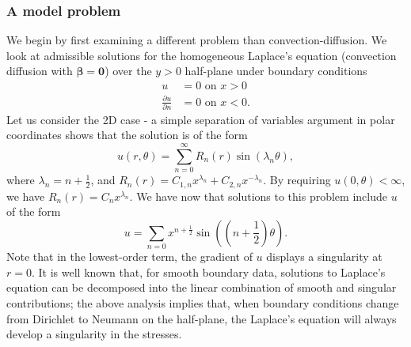 \documentclass[letterpaper]{article}
\def\bbeta{\boldsymbol\beta}
\newcommand{\bs}[1]{\boldsymbol{#1}}
\newcommand{\seclab}[1]{\label{sec:#1}}
\newcommand{\LRp}[1]{\left( #1 \right)}
\newcommand{\pd}[2]{\frac{\partial#1}{\partial#2}}
\begin{document}
\subsubsection{A model problem}
\seclab{sec:confusionPlate}
We begin by first examining a different problem than convection-diffusion.
We look at admissible solutions for the homogeneous Laplace's equation
(convection diffusion with $\bbeta=\bs 0$) over
the $y > 0$ half-plane under boundary conditions
\begin{align*}
u &= 0 \text{ on } x > 0\\
\pd{u}{n} &= 0 \text{ on } x < 0.
\end{align*}
Let us consider the 2D case - a simple separation of variables argument in
polar coordinates shows that the solution is of the form
\[
u(r,\theta) = \sum_{n=0}^\infty R_n(r) \sin(\lambda_n \theta),
\]
where $\lambda_n = n + \frac{1}{2}$, and $R_n(r) = C_{1,n}x^{\lambda_n} +
C_{2,n}x^{-\lambda_n}$.  By requiring $u(0,\theta) < \infty$, we have $R_n(r)
= C_n x^{\lambda_n}$.  We have now that solutions to this problem include $u$
of the form
\[
u = \sum_{n=0} x^{n+\frac{1}{2}} \sin\LRp{\LRp{n+\frac{1}{2}}\theta}.
\]
Note that in the lowest-order term, the gradient of $u$ displays a
singularity at $r = 0$. It is well known that, for smooth boundary data,
solutions to Laplace's equation can be decomposed into the linear combination
of smooth and singular contributions; the above analysis implies that, when
boundary conditions change from Dirichlet to Neumann on the half-plane, the
Laplace's equation will always develop a singularity in the stresses.
\end{document}
